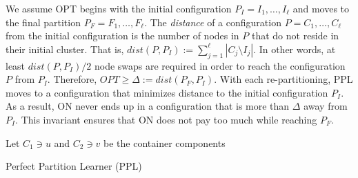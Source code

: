 \documentclass[manuscript,screen=true]{acmart}
\newcommand{\OPT}{\mathit{OPT}}
\DeclarePairedDelimiter\set{\{}{\}}
\begin{document}
     
We assume OPT begins with the initial configuration
$P_I = I_1, \dots, I_{\ell}$ and moves to the final partition
$P_F = F_1, \dots, F_{\ell}$.
 The \emph{distance} of a configuration $P = C_1, \dots, C_{\ell}$ from the initial configuration is the number of nodes in $P$ that do not reside in their initial cluster.
    That is,
    $\mathit{dist}(P, P_I) := \sum_{j=1}^{\ell} | C_j \setminus I_j |$. 
In other words,
at least $\mathit{dist}(P, P_I)/2$ node swaps are required in order to reach the configuration $P$ from $P_I$.
Therefore,
$\OPT \geq \Delta:= dist(P_F, P_I) $.
 With each re-partitioning,
  PPL moves to a configuration that minimizes distance to the initial configuration $P_I$.
As a result,
ON never ends up in a configuration that is more than $\Delta$ away from $P_I$.
This invariant ensures that ON does not pay too much while reaching $P_F$.


\begin{algorithm}
    \renewcommand{\algorithmicrequire}{\textbf{Input:}}
    \renewcommand{\algorithmicensure}{\textbf{Output:}}
    \begin{algorithmic}
         \label{line:initcomponents}
        \STATE Let $C_1 \ni u$ and $C_2 \ni v$ be the container components
         \label{line:mergecomponents}
        \label{line:rebalance} 
        \ENDIF
        \ENDIF
        \ENDFOR
    \end{algorithmic}
    \caption{Perfect Partition Learner (PPL)}
    \label{alg:ppl}
      \end{algorithm}
  
\end{document}
